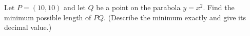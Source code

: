 Let $P=(10,10)$ and let $Q$ be a point on the parabola $y=x^2$. Find the minimum possible length of $PQ$. (Describe the minimum exactly and give its decimal value.)
